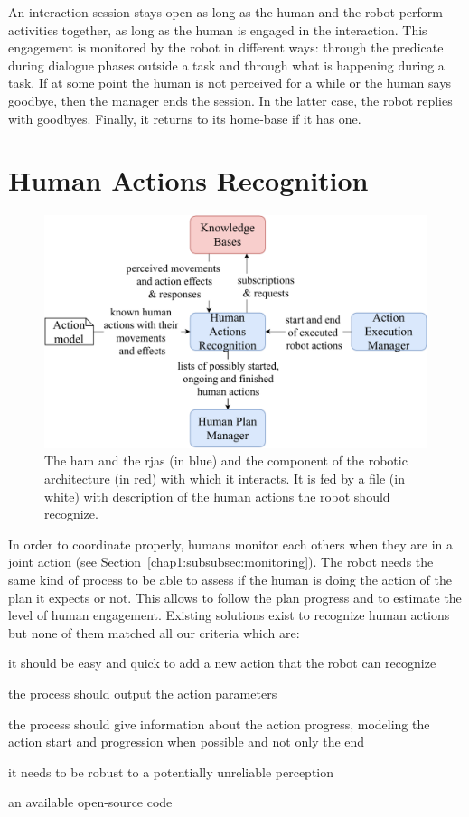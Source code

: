\documentclass[a4paper,11pt,twoside]{StyleThese}
\begin{document}
An interaction session stays open as long as the human and the robot perform activities together, \ie as long as the human is engaged in the interaction. This engagement is monitored by the robot in different ways: through the predicate  during dialogue phases outside a task and through what is happening during a task. If at some point the human is not perceived for a while or the human says goodbye, then the manager ends the session. In the latter case, the robot replies with goodbyes. Finally, it returns to its home-base if it has one.

\section{Human Actions Recognition}\label{chap6:sec:h_moni}
\begin{figure}[!hbt]
	\centering
	\includegraphics[width=0.8\linewidth]{figures/chapter2/action_reco_zoom.pdf}
	\caption{The \acrlong{ham} and the \acrshort{rja}s (in blue) and the component of the robotic architecture (in red) with which it interacts. It is fed by a file (in white) with description of the human actions the robot should recognize.}
	\label{chap6:fig:action_monitoring_zoom}
\end{figure}

In order to coordinate properly, humans monitor each others when they are in a joint action (see Section~\ref{chap1:subsubsec:monitoring}). The robot needs the same kind of process to be able to assess if the human is doing the action of the plan it expects or not. This allows to follow the plan progress and to estimate the level of human engagement. Existing solutions exist to recognize human actions but none of them matched all our criteria which are: 
\begin{bulletList}
	\item it should be easy and quick to add a new action that the robot can recognize
	\item the process should output the action parameters
	\item the process should give information about the action progress, \ie modeling the action start and progression when possible and not only the end
	\item it needs to be robust to a potentially unreliable perception
	\item an available open-source code 
\end{bulletList}
\end{document}
